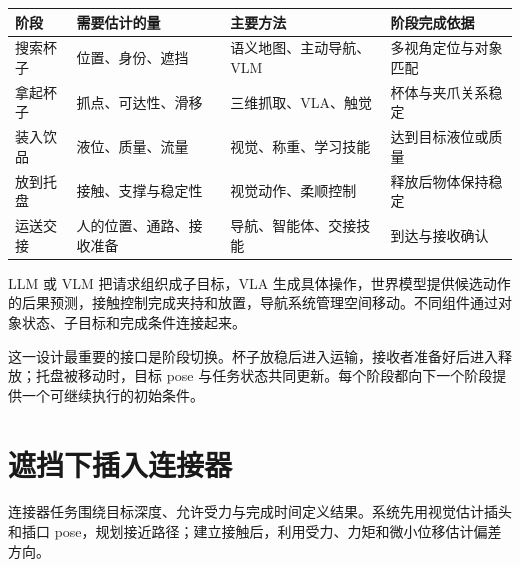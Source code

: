 \documentclass[UTF8,a4paper,11pt,oneside,openany,fontset=none]{ctexbook}
\begin{document}
{\small %
\begin{longtable}[]{@{}
  >{\raggedright\arraybackslash}p{}
  >{\raggedright\arraybackslash}p{}
  >{\raggedright\arraybackslash}p{}
  >{\raggedright\arraybackslash}p{}@{}}
\toprule\noalign{}
\begin{minipage}[b]{\linewidth}\raggedright
阶段
\end{minipage} & \begin{minipage}[b]{\linewidth}\raggedright
需要估计的量
\end{minipage} & \begin{minipage}[b]{\linewidth}\raggedright
主要方法
\end{minipage} & \begin{minipage}[b]{\linewidth}\raggedright
阶段完成依据
\end{minipage} \\
\midrule\noalign{}
\endhead
\bottomrule\noalign{}
\endlastfoot
搜索杯子 & 位置、身份、遮挡 & 语义地图、主动导航、VLM & 多视角定位与对象匹配 \\
拿起杯子 & 抓点、可达性、滑移 & 三维抓取、VLA、触觉 & 杯体与夹爪关系稳定 \\
装入饮品 & 液位、质量、流量 & 视觉、称重、学习技能 & 达到目标液位或质量 \\
放到托盘 & 接触、支撑与稳定性 & 视觉动作、柔顺控制 & 释放后物体保持稳定 \\
运送交接 & 人的位置、通路、接收准备 & 导航、智能体、交接技能 & 到达与接收确认 \\
\end{longtable}
}

LLM 或 VLM 把请求组织成子目标，VLA 生成具体操作，世界模型提供候选动作的后果预测，接触控制完成夹持和放置，导航系统管理空间移动。不同组件通过对象状态、子目标和完成条件连接起来。

这一设计最重要的接口是阶段切换。杯子放稳后进入运输，接收者准备好后进入释放；托盘被移动时，目标 pose 与任务状态共同更新。每个阶段都向下一个阶段提供一个可继续执行的初始条件。

\section{遮挡下插入连接器}

连接器任务围绕目标深度、允许受力与完成时间定义结果。系统先用视觉估计插头和插口 pose，规划接近路径；建立接触后，利用受力、力矩和微小位移估计偏差方向。
\end{document}
